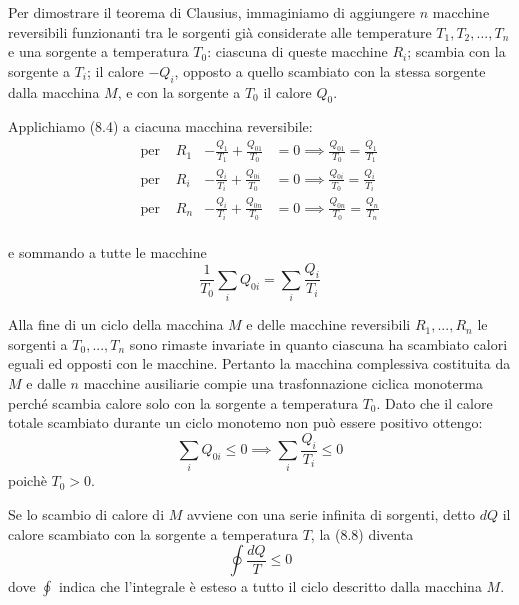 \documentclass[class=book, crop=false, oneside, 12pt]{standalone}
\begin{document}
Per dimostrare il teorema di Clausius, immaginiamo di aggiungere \(n\) macchine reversibili funzionanti tra le sorgenti già considerate alle temperature \(T_1 , T_2 , ... , T_n\) e una sorgente a temperatura \(T_0\): ciascuna di queste macchine \(R_i\); scambia con la sorgente a \(T_i\); il calore \(-Q_i\), opposto a quello scambiato con la stessa sorgente dalla macchina \(M\), e con la sorgente a \(T_0\) il calore \(Q_0\).

Applichiamo (8.4) a ciacuna macchina reversibile:\newline
\begin{align*}
    \text{per } &R_1 & -\frac{Q_1}{T_1} + \frac{Q_{01}}{T_0} &= 0 \implies \frac{Q_{01}}{T_0} = \frac{Q_1}{T_1} \\
    \text{per } &R_i & -\frac{Q_i}{T_i} + \frac{Q_{0i}}{T_0} &= 0 \implies \frac{Q_{0i}}{T_0} = \frac{Q_i}{T_i} \\
    \text{per } &R_n & -\frac{Q_i}{T_i} + \frac{Q_{0n}}{T_0} &= 0 \implies \frac{Q_{0n}}{T_0} = \frac{Q_n}{T_n} \\
\end{align*}

e sommando a tutte le macchine 
\begin{equation*}
    \frac{1}{T_0} \sum_i Q_{0i} = \sum_{i} \frac{Q_i}{T_i}
\end{equation*}

Alla fine di un ciclo della macchina \(M\) e delle macchine reversibili \(R_1, ... , R_n\) le sorgenti a \(T_0, ... , T_n\) sono rimaste invariate in quanto ciascuna ha scambiato calori eguali ed opposti con le macchine. 
Pertanto la macchina complessiva costituita da \(M\) e dalle \(n\) macchine ausiliarie compie una trasfonnazione ciclica monoterma perché scambia calore solo con la sorgente a temperatura \(T_0\).
Dato che il calore totale scambiato durante un ciclo monotemo non può essere positivo ottengo:
\begin{equation*}
    \sum_i Q_{0i} \leq 0 \implies \sum_i \frac{Q_i}{T_i} \leq 0
\end{equation*}
poichè \(T_0 > 0 \).

Se lo scambio di calore di \(M\) avviene con una serie infinita di sorgenti, detto \(d Q\) il calore scambiato con la sorgente a temperatura \(T\), la (8.8) diventa
\begin{equation}
    \oint \frac{d Q}{T} \leq 0
\end{equation}
dove \(\oint\) indica che l'integrale è esteso a tutto il ciclo descritto dalla macchina \(M\).
\end{document}
